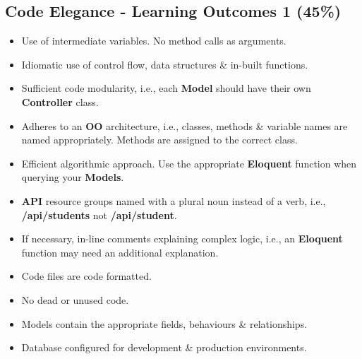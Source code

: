 \documentclass{article}
\begin{document}
\subsection*{Code Elegance - Learning Outcomes 1 (45\%)}
\begin{itemize}
	\item Use of intermediate variables. No method calls as arguments.
	\item Idiomatic use of control flow, data structures \& in-built functions.
	\item Sufficient code modularity, i.e., each \textbf{Model} should have their own \textbf{Controller} class.
	\item Adheres to an \textbf{OO} architecture, i.e., classes, methods \& variable names are named appropriately. Methods are assigned to the correct class.
	\item Efficient algorithmic approach. Use the appropriate \textbf{Eloquent} function when querying your \textbf{Models}.
	\item \textbf{API} resource groups named with a plural noun instead of a verb, i.e., \textbf{/api/students} not \textbf{/api/student}.
	\item If necessary, in-line comments explaining complex logic, i.e., an \textbf{Eloquent} function may need an additional explanation.
	\item Code files are code formatted.
	\item No dead or unused code.
	\item Models contain the appropriate fields, behaviours \& relationships.
	\item Database configured for development \& production environments.
\end{itemize}
\end{document}
